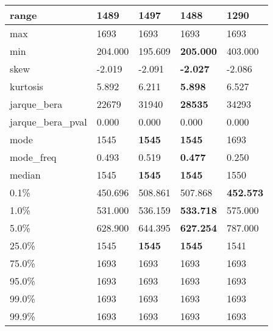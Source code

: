 \begin{table}[H]
\begin{tabular}{|l|m{10em}|m{10em}|m{10em}|m{10em}|}
\hline range & 1489 & 1497 & \bfseries 1488 & \cellcolor[rgb]{0.9, 0.54, 0.52} 1290 \\
\hline max & 1693 & 1693 & 1693 & 1693 \\
\hline min & 204.000 & 195.609 & \bfseries 205.000 & \cellcolor[rgb]{0.9, 0.54, 0.52} 403.000 \\
\hline skew & -2.019 & \cellcolor[rgb]{0.9, 0.54, 0.52} -2.091 & \bfseries -2.027 & -2.086 \\
\hline kurtosis & 5.892 & 6.211 & \bfseries 5.898 & \cellcolor[rgb]{0.9, 0.54, 0.52} 6.527 \\
\hline jarque\_bera & 22679 & 31940 & \bfseries 28535 & \cellcolor[rgb]{0.9, 0.54, 0.52} 34293 \\
\hline jarque\_bera\_pval & 0.000 & 0.000 & 0.000 & 0.000 \\
\hline mode & 1545 & \bfseries 1545 & \bfseries 1545 & \cellcolor[rgb]{0.9, 0.54, 0.52} 1693 \\
\hline mode\_freq & 0.493 & 0.519 & \bfseries 0.477 & \cellcolor[rgb]{0.9, 0.54, 0.52} 0.250 \\
\hline median & 1545 & \bfseries 1545 & \bfseries 1545 & \cellcolor[rgb]{0.9, 0.54, 0.52} 1550 \\
\hline 0.1\% & 450.696 & \cellcolor[rgb]{0.9, 0.54, 0.52} 508.861 & 507.868 & \bfseries 452.573 \\
\hline 1.0\% & 531.000 & 536.159 & \bfseries 533.718 & \cellcolor[rgb]{0.9, 0.54, 0.52} 575.000 \\
\hline 5.0\% & 628.900 & 644.395 & \bfseries 627.254 & \cellcolor[rgb]{0.9, 0.54, 0.52} 787.000 \\
\hline 25.0\% & 1545 & \bfseries 1545 & \bfseries 1545 & \cellcolor[rgb]{0.9, 0.54, 0.52} 1541 \\
\hline 75.0\% & 1693 & 1693 & 1693 & 1693 \\
\hline 95.0\% & 1693 & 1693 & 1693 & 1693 \\
\hline 99.0\% & 1693 & 1693 & 1693 & 1693 \\
\hline 99.9\% & 1693 & 1693 & 1693 & 1693 \\
\hline
\end{tabular}
\end{table}
